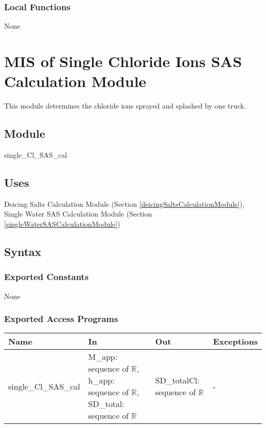 \documentclass[12pt, titlepage]{article}
\begin{document}
\subsubsection{Local Functions}
None
\newpage


\section{MIS of Single Chloride Ions SAS Calculation Module} \label{singleChlorideIonsSASCalculation Module}
This module determines the chloride ions sprayed and splashed by one truck.

\subsection{Module}
single\_Cl\_SAS\_cal

\subsection{Uses}

Deicing Salts Calculation Module (Section \ref{deicingSaltsCalculationModule}), Single Water SAS Calculation Module (Section \ref{singleWaterSASCalculationModule})


\subsection{Syntax}

\subsubsection{Exported Constants}
None
\subsubsection{Exported Access Programs}

\begin{center}
\begin{tabular}{p{3cm} p{4.5cm} p{5cm} p{2cm}}
\hline
\textbf{Name} & \textbf{In} & \textbf{Out} & \textbf{Exceptions} \\
\hline
single\_Cl\_SAS\_cal & M\_app: sequence of $\mathbb{R}$, h\_app: sequence of $\mathbb{R}$, SD\_total: sequence of $\mathbb{R}$ & SD\_totalCl: sequence of $\mathbb{R}$ & - \\

\hline
\end{tabular}
\end{center}
\end{document}
